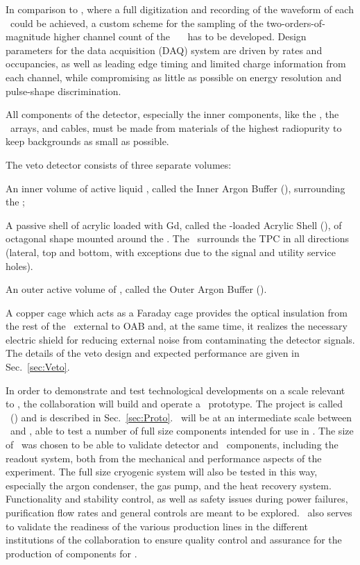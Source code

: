 In comparison to \DSfs, where a full digitization and recording of the waveform of each \PMT\ could be achieved, a custom scheme for the sampling of the two-orders-of-magnitude higher channel count of the \DSks\ \SiPM\ \DSkPdms\ has to be developed. Design parameters for the data acquisition (DAQ) system are driven by rates and occupancies, as well as leading edge timing and limited charge information from each channel, while compromising as little as possible on energy resolution and pulse-shape discrimination. %

All components of the detector, especially the inner components, like the \LArTPC, the \SiPM\ arrays, and cables, must be made from materials of the highest radiopurity to keep backgrounds as small as possible.

The veto detector consists of three separate volumes:

\begin{compactitem}
\item An inner volume of active liquid \AAr, called the Inner Argon Buffer (\IAB), surrounding the \TPC;
\item A passive shell of acrylic loaded with Gd, called the -loaded Acrylic Shell (\GdAS), of octagonal shape mounted around the \IAB.  The \GdAS\ surrounds the TPC in all directions (lateral, top and bottom, with exceptions due to the signal and utility service holes). 
\item An outer active volume of \AAr, called the Outer Argon Buffer (\OAB).
\end{compactitem}

A copper cage which acts as a Faraday cage provides the optical insulation from the rest of the \AAr\ external to OAB and, at the same time, it realizes the necessary electric shield for reducing external noise from contaminating the detector signals.  The details of the veto design and expected performance are given in Sec.~\ref{sec:Veto}.

In order to demonstrate and test technological developments on a scale relevant to \DSks, the collaboration will build and operate a \DSpApproximateMass\ prototype. The project is called \DSp\ (\DSps) and is described in Sec.~\ref{sec:Proto}. \DSp\ will be at an intermediate scale between \DSfs\ and \DSks, able to test a number of full size components intended for use in \DSks.  The size of \DSps\ was chosen to be able to validate detector and \DSkPdm\ components, including the readout system, both from the mechanical and performance aspects of the experiment. The full size cryogenic system will also be tested in this way, especially the argon condenser, the gas pump, and the heat recovery system. Functionality and stability control, as well as safety issues during power failures, purification flow rates and general controls are meant to be explored. \DSps\ also serves to validate the readiness of the various production lines in the different institutions of the collaboration to ensure quality control and assurance for the production of components for \DSks.


